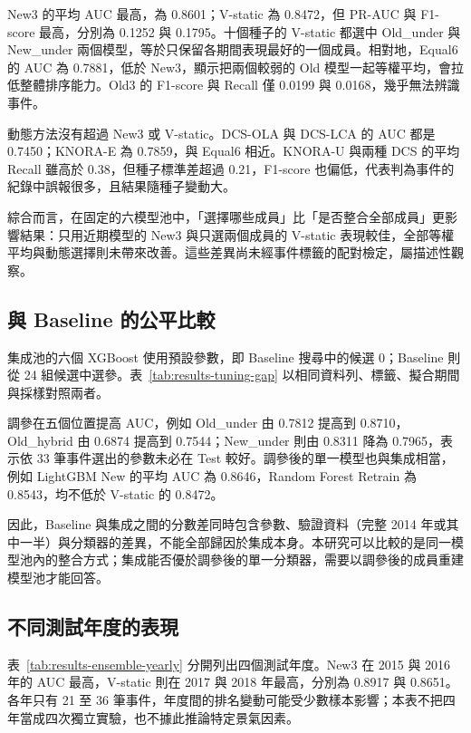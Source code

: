 New3 的平均 AUC 最高，為 0.8601；V-static 為 0.8472，但 PR-AUC 與 F1-score 最高，分別為 0.1252 與 0.1795。十個種子的 V-static 都選中 Old\_under 與 New\_under 兩個模型，等於只保留各期間表現最好的一個成員。相對地，Equal6 的 AUC 為 0.7881，低於 New3，顯示把兩個較弱的 Old 模型一起等權平均，會拉低整體排序能力。Old3 的 F1-score 與 Recall 僅 0.0199 與 0.0168，幾乎無法辨識事件。

動態方法沒有超過 New3 或 V-static。DCS-OLA 與 DCS-LCA 的 AUC 都是 0.7450；KNORA-E 為 0.7859，與 Equal6 相近。KNORA-U 與兩種 DCS 的平均 Recall 雖高於 0.38，但種子標準差超過 0.21，F1-score 也偏低，代表判為事件的紀錄中誤報很多，且結果隨種子變動大。

綜合而言，在固定的六模型池中，「選擇哪些成員」比「是否整合全部成員」更影響結果：只用近期模型的 New3 與只選兩個成員的 V-static 表現較佳，全部等權平均與動態選擇則未帶來改善。這些差異尚未經事件標籤的配對檢定，屬描述性觀察。

\subsection{與 Baseline 的公平比較}

集成池的六個 XGBoost 使用預設參數，即 Baseline 搜尋中的候選 0；Baseline 則從 24 組候選中選參。表~\ref{tab:results-tuning-gap} 以相同資料列、標籤、擬合期間與採樣對照兩者。



調參在五個位置提高 AUC，例如 Old\_under 由 0.7812 提高到 0.8710，Old\_hybrid 由 0.6874 提高到 0.7544；New\_under 則由 0.8311 降為 0.7965，表示依 33 筆事件選出的參數未必在 Test 較好。調參後的單一模型也與集成相當，例如 LightGBM New 的平均 AUC 為 0.8646，Random Forest Retrain 為 0.8543，均不低於 V-static 的 0.8472。

因此，Baseline 與集成之間的分數差同時包含參數、驗證資料（完整 2014 年或其中一半）與分類器的差異，不能全部歸因於集成本身。本研究可以比較的是同一模型池內的整合方式；集成能否優於調參後的單一分類器，需要以調參後的成員重建模型池才能回答。

\subsection{不同測試年度的表現}



表~\ref{tab:results-ensemble-yearly} 分開列出四個測試年度。New3 在 2015 與 2016 年的 AUC 最高，V-static 則在 2017 與 2018 年最高，分別為 0.8917 與 0.8651。各年只有 21 至 36 筆事件，年度間的排名變動可能受少數樣本影響；本表不把四年當成四次獨立實驗，也不據此推論特定景氣因素。

